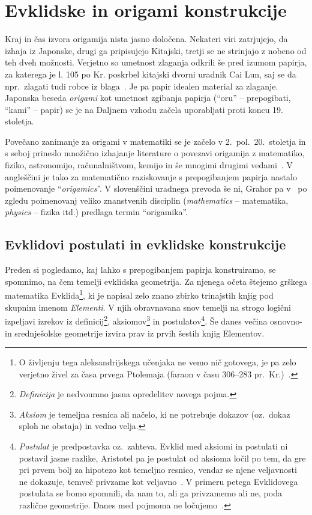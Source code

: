 \section{Evklidske in origami konstrukcije}
\label{pogl:aksiomi}

Kraj in čas izvora origamija nista jasno določena. Nekateri viri zatrjujejo, da izhaja iz Japonske, drugi ga pripisujejo Kitajski, tretji se ne strinjajo z nobeno od teh dveh možnosti. Verjetno so umetnost zlaganja odkrili še pred izumom papirja, za katerega je l. 105 po Kr. poskrbel kitajski dvorni uradnik Cai Lun, saj se da npr.\ zlagati tudi robce iz blaga~\cite{robinson2024}. Je pa papir idealen material za zlaganje. Japonska beseda \emph{origami} kot umetnost zgibanja papirja (``oru'' -- prepogibati, ``kami'' -- papir) se je na Daljnem vzhodu začela uporabljati proti koncu 19. stoletja.

Povečano zanimanje za origami v matematiki se je začelo v 2.\ pol.\ 20.\ stoletja in s seboj prineslo množično izhajanje literature o povezavi origamija z matematiko, fiziko, astronomijo, računalništvom, kemijo in še mnogimi drugimi vedami~\cite{zore2022}. V angleščini je tako za matematično raziskovanje s prepogibanjem papirja nastalo poimenovanje ``\emph{origamics}''. V slovenščini uradnega prevoda še ni, Grahor pa v~\cite[str.\ 5]{sgv2016} po zgledu poimenovanj veliko znanstvenih disciplin (\emph{mathematics} -- matematika, \emph{physics} -- fizika itd.) predlaga termin ``origamika''.

\subsection{Evklidovi postulati in evklidske konstrukcije}

Preden si pogledamo, kaj lahko s prepogibanjem papirja konstruiramo, se spomnimo, na čem temelji evklidska geometrija. Za njenega očeta štejemo grškega matematika Evklida\footnote{O življenju tega aleksandrijskega učenjaka ne vemo nič gotovega, je pa zelo verjetno živel za časa prvega Ptolemaja (faraon v času 306--283 pr.\ Kr.)~\cite[str.\ 61]{struik1986}.}, ki je napisal zelo znano zbirko trinajstih knjig pod skupnim imenom \emph{Elementi}. V njih obravnavana snov temelji na strogo logični izpeljavi izrekov iz definicij\footnote{\emph{Definicija} je nedvoumno jasna opredelitev novega pojma.}, aksiomov\footnote{\emph{Aksiom} je temeljna resnica ali načelo, ki ne potrebuje dokazov (oz.\ dokaz sploh ne obstaja) in vedno velja.} in postulatov\footnote{\emph{Postulat} je predpostavka oz.\ zahteva. Evklid med aksiomi in postulati ni postavil jasne razlike, Aristotel pa je postulat od aksioma ločil po tem, da gre pri prvem bolj za hipotezo kot temeljno resnico, vendar se njene veljavnosti ne dokazuje, temveč privzame kot veljavno~\cite[str.\ 122]{euclidI}. V primeru petega Evklidovega postulata se bomo spomnili, da nam to, ali ga privzamemo ali ne, poda različne geometrije. Danes med pojmoma ne ločujemo~\cite[str.\ 2]{geometricconstructions}.}. Še danes večina osnovno- in srednješolske geometrije izvira prav iz prvih šestih knjig Elementov.

